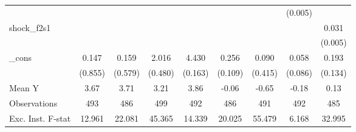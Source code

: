 {\begin{tabular}{l*{8}{c}}
            &                     &                     &                     &                     &                     &                     &     (0.005)         &                     \\
\addlinespace
shock\_f2s1  &                     &                     &                     &                     &                     &                     &                     &       0.031\sym{***}\\
            &                     &                     &                     &                     &                     &                     &                     &     (0.005)         \\
\addlinespace
\_cons      &       0.147         &       0.159         &       2.016\sym{***}&       4.430\sym{***}&       0.256\sym{**} &       0.090         &       0.058         &       0.193         \\
            &     (0.855)         &     (0.579)         &     (0.480)         &     (0.163)         &     (0.109)         &     (0.415)         &     (0.086)         &     (0.134)         \\
\midrule
Mean Y      &        3.67         &        3.71         &        3.21         &        3.86         &       -0.06         &       -0.65         &       -0.18         &        0.13         \\
Observations&         493         &         486         &         499         &         492         &         486         &         491         &         492         &         485         \\
Exc. Inst. F-stat&      12.961         &      22.081         &      45.365         &      14.339         &      20.025         &      55.479         &       6.168         &      32.995         \\
\bottomrule
\end{tabular}
}
